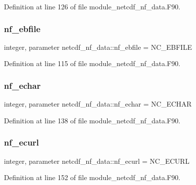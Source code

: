 Definition at line 126 of file module\+\_\+netcdf\+\_\+nf\+\_\+data.\+F90.

\mbox{\label{namespacenetcdf__nf__data_a00bf57710d47fba9afbfe51ce91e36a1}} 
\subsubsection{\texorpdfstring{nf\+\_\+ebfile}{nf\_ebfile}}
{\footnotesize\ttfamily integer, parameter netcdf\+\_\+nf\+\_\+data\+::nf\+\_\+ebfile = N\+C\+\_\+\+E\+B\+F\+I\+LE}



Definition at line 115 of file module\+\_\+netcdf\+\_\+nf\+\_\+data.\+F90.

\mbox{\label{namespacenetcdf__nf__data_a6b8d3f930f91dcd4c9ceea47452fd11a}} 
\subsubsection{\texorpdfstring{nf\+\_\+echar}{nf\_echar}}
{\footnotesize\ttfamily integer, parameter netcdf\+\_\+nf\+\_\+data\+::nf\+\_\+echar = N\+C\+\_\+\+E\+C\+H\+AR}



Definition at line 138 of file module\+\_\+netcdf\+\_\+nf\+\_\+data.\+F90.

\mbox{\label{namespacenetcdf__nf__data_a5316537c3ed2e5b72696fab1ed502cfc}} 
\subsubsection{\texorpdfstring{nf\+\_\+ecurl}{nf\_ecurl}}
{\footnotesize\ttfamily integer, parameter netcdf\+\_\+nf\+\_\+data\+::nf\+\_\+ecurl = N\+C\+\_\+\+E\+C\+U\+RL}



Definition at line 152 of file module\+\_\+netcdf\+\_\+nf\+\_\+data.\+F90.

